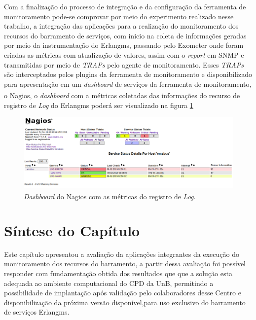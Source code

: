 Com a finalização do processo de integração e da configuração da ferramenta de monitoramento pode-se comprovar por meio do experimento realizado nesse trabalho, a integração das aplicações para a realização do monitoramento dos recursos do barramento de serviços, com inicio na coleta de informações geradas por meio da instrumentação do Erlangms, passando pelo Exometer onde foram criadas as métricas com atualização de valores, assim com o \textit{report} em \acrshort{SNMP} e transmitidas por meio de \textit{TRAPs} pelo agente de monitoramento. Esses \textit{TRAPs} são interceptados pelos plugins da ferramenta de monitoramento e disponibilizado para apresentação em um \textit{dashboard} de serviços da ferramenta de monitoramento, o Nagios\textsuperscript{\textregistered}, o \textit{dashboard} com a métricas coletadas das informações do recurso de registro de \textit{Log} do Erlangms poderá ser visualizado na figura \ref{fun:fig:nagiosDashbordEmsbus}

\begin{figure}[H]
    \centering
    \includegraphics[scale = 0.57]{img/nagiosConfigurado.png}
    \caption{\textit{Dashboard} do Nagios\textsuperscript{\textregistered} com as métricas do registro de \textit{Log}.}
    \label{fun:fig:nagiosDashbordEmsbus}
\end{figure}
 

\section{Síntese do Capítulo}
\label{sintese5}

Este capítulo apresentou a avaliação da aplicações integrantes da execução do monitoramento dos recursos do barramento, a partir dessa avaliação foi possível responder com fundamentação obtida dos resultados que que a solução esta adequada ao ambiente computacional do \acrshort{CPD} da \acrshort{UnB}, permitindo a possibilidade de implantação após validação pelo colaboradores desse Centro e disponibilização da próxima versão disponível,para uso exclusivo do barramento de serviços Erlangms.